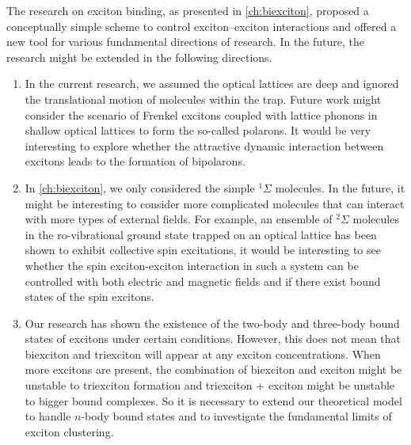 %
%
%

The research on exciton binding, as presented in \autoref{ch:biexciton}, proposed a conceptually simple scheme to control 
exciton--exciton interactions and offered a new tool for various fundamental directions of research. In the future, the research might be extended in the following directions.
\begin{enumerate}
%
\item In the current research, we 
assumed the optical lattices are deep and ignored the translational motion of molecules within the trap. Future work might 
consider the scenario of Frenkel excitons coupled with lattice phonons in shallow optical lattices to form the so-called polarons. It would be very interesting to explore whether the attractive dynamic interaction 
between excitons leads to the formation of bipolarons. 
%
\item In \autoref{ch:biexciton}, we only considered the simple 
$^{1}\Sigma$ molecules. In the future, it might be interesting to consider more complicated molecules that can interact 
with more types of external fields. For example, an ensemble of $^{2}\Sigma$ molecules in the ro-vibrational
ground state trapped on an optical lattice has been shown to exhibit collective spin excitations, it would be interesting to 
see whether the spin exciton-exciton interaction in such a system can be controlled with both electric and magnetic fields and if there exist
bound states of the spin excitons. 
%
\item Our research has shown the existence of  the two-body and three-body bound states of excitons under certain 
conditions. However, this does not mean that biexciton and triexciton will appear at any exciton concentrations. 
When more excitons are present, the combination of biexciton and exciton might be unstable to triexciton formation
and triexciton $+$ exciton might be unstable to bigger bound complexes.  So it is necessary to extend our theoretical
model to handle $n$-body bound states and to investigate the fundamental limits of exciton clustering. 
\end{enumerate}

